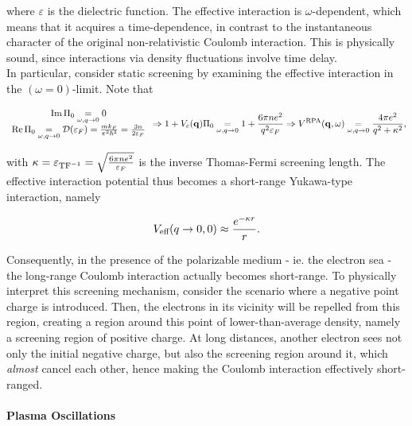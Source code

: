 where $\varepsilon$ is the dielectric function. The effective interaction is $\omega$-dependent, which means that it acquires a time-dependence, in contrast to the instantaneous character of the original non-relativistic Coulomb interaction. This is physically sound, since interactions via density fluctuations involve time delay. \\

In particular, consider static screening by examining the effective interaction in the $(\omega = 0)$-limit. Note that 

\begin{equation}
    \begin{array}{cc}
         \Im \Pi_0 \underset{\omega, q \rightarrow 0}{=} 0  \\
         \Re \Pi_0 \underset{\omega, q \rightarrow 0}{=} \mathcal{D}(\varepsilon_F) = \frac{m k_F}{\pi^2 \hbar^2} = \frac{3 n}{2 \varepsilon_F}
    \end{array} \Rightarrow 1+V_c({\bf q}) \Pi_0 \underset{\omega, q \rightarrow 0}{=} 1 + \frac{6 \pi n e^2}{q^2 \varepsilon_F} \Rightarrow V^{\textnormal{RPA}}({\bf q}, \omega) \underset{\omega, q \rightarrow 0}{=} \frac{4\pi e^2}{q^2 + \kappa^2},
\end{equation}

with $\kappa = \varepsilon_{\textnormal{TF}^{-1}} = \sqrt{\frac{6 \pi n e^2}{ \varepsilon_F}}$ is the inverse Thomas-Fermi screening length. The effective interaction potential thus becomes a short-range Yukawa-type interaction, namely 

$$
    V_{\textnormal{eff}}(q\rightarrow 0, 0) \approx \frac{e^{-\kappa r}}{r}.
$$

Consequently, in the presence of the polarizable medium - ie. the electron sea - the long-range Coulomb interaction actually becomes short-range. To physically interpret this screening mechanism, consider the scenario where a negative point charge is introduced. Then, the electrons in its vicinity will be repelled from this region, creating a region around this point of lower-than-average density, namely a screening region of positive charge.
At long distances, another electron sees not only the initial negative charge, but also the screening region around it, which \textit{almost} cancel each other, hence making the Coulomb interaction effectively short-ranged. \\

\paragraph{Plasma Oscillations}

